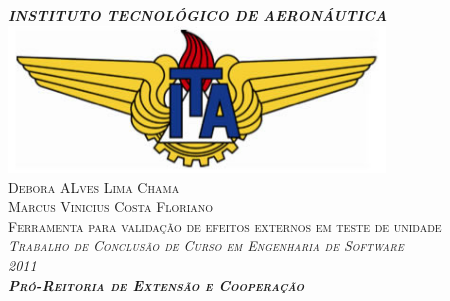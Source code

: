 \begin{titlepage}
	
\begin{center}
\textsc{\Large \bfseries \emph{INSTITUTO TECNOLÓGICO DE AERONÁUTICA}}\\[2cm]
\includegraphics[width=0.75\textwidth]{./ita}\\[2cm]
\textsc{\small Debora ALves Lima Chama\\Marcus Vinicius Costa Floriano}\\[1cm]
\textsc{\large Ferramenta para validação de efeitos externos em teste de unidade}\\[3cm]
\textsc{\Large \emph{Trabalho de Conclusão de Curso em Engenharia de Software}}\\[0.2cm]
\textsc{\Large \emph{2011}}\\[2cm]
\textsc{\huge \bfseries \emph{Pró-Reitoria de Extensão e Cooperação}}\\[0cm]
\end{center}

\end{titlepage}